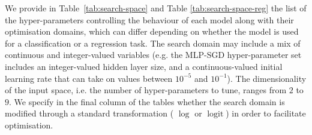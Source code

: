 \documentclass[jair,twoside,11pt,theapa]{article}
\theoremstyle{definition}
\begin{document}
    We provide in Table~\ref{tab:search-space} and Table \ref{tab:search-space-reg} the list of the hyper-parameters controlling the behaviour of each model along with their optimisation domains, which can differ depending on whether the model is used for a classification or a regression task. The search domain may include a mix of continuous and integer-valued variables (e.g. the MLP-SGD hyper-parameter set includes an integer-valued hidden layer size, and a continuous-valued initial learning rate that can take on values between $10^{-5}$ and $10^{-1}$). The dimensionality of the input space, i.e. the number of hyper-parameters to tune, ranges from $2$ to $9$. We specify in the final column of the tables whether the search domain is modified through a standard transformation ( $\log$ or $\operatorname{logit}$) in order to facilitate optimisation. 
    
\end{document}
